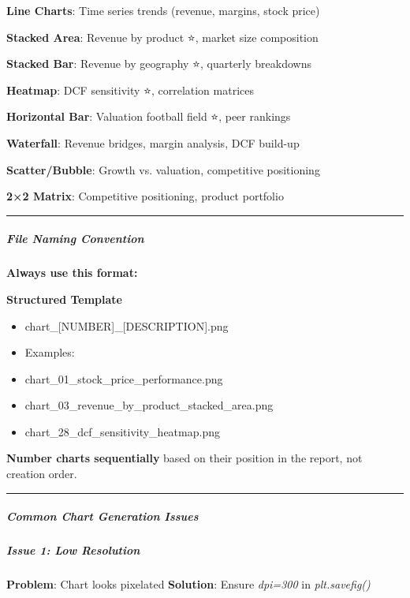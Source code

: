 \documentclass[11pt]{article}
\begin{document}
\textbf{Line Charts}: Time series trends (revenue, margins, stock price)


\textbf{Stacked Area}: Revenue by product ⭐, market size composition


\textbf{Stacked Bar}: Revenue by geography ⭐, quarterly breakdowns


\textbf{Heatmap}: DCF sensitivity ⭐, correlation matrices


\textbf{Horizontal Bar}: Valuation football field ⭐, peer rankings


\textbf{Waterfall}: Revenue bridges, margin analysis, DCF build-up


\textbf{Scatter/Bubble}: Growth vs. valuation, competitive positioning


\textbf{2×2 Matrix}: Competitive positioning, product portfolio


\vspace{0.5em}\hrule\vspace{0.5em}

\subparagraph{File Naming Convention}\mbox{}\par

\textbf{Always use this format:}

\textbf{Structured Template}
\begin{itemize}[leftmargin=*,itemsep=2pt,topsep=2pt]
\item {} chart\_\allowbreak{}[NUMBER]\_\allowbreak{}[DESCRIPTION].png
\item {} Examples:
\item {} chart\_\allowbreak{}01\_\allowbreak{}stock\_\allowbreak{}price\_\allowbreak{}performance.png
\item {} chart\_\allowbreak{}03\_\allowbreak{}revenue\_\allowbreak{}by\_\allowbreak{}product\_\allowbreak{}stacked\_\allowbreak{}area.png
\item {} chart\_\allowbreak{}28\_\allowbreak{}dcf\_\allowbreak{}sensitivity\_\allowbreak{}heatmap.png
\end{itemize}

\textbf{Number charts sequentially} based on their position in the report, not creation order.


\vspace{0.5em}\hrule\vspace{0.5em}

\subparagraph{Common Chart Generation Issues}\mbox{}\par

\subparagraph{Issue 1: Low Resolution}\mbox{}\par
\textbf{Problem}: Chart looks pixelated \textbf{Solution}: Ensure \emph{dpi=300} in \emph{plt.savefig()}
\end{document}
